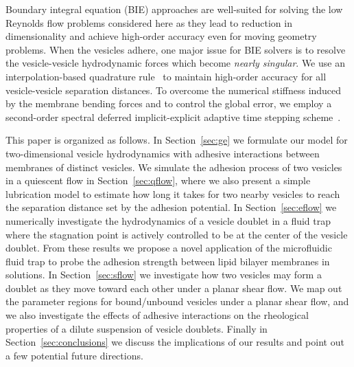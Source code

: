\documentclass[prf,superscriptaddress,showkeys]{revtex4-1}
\begin{document}
Boundary integral equation (BIE) approaches are well-suited for solving
the low Reynolds flow problems considered here as they lead to reduction
in dimensionality and achieve high-order accuracy even for moving
geometry problems. When the vesicles adhere, one major issue for BIE
solvers is to resolve the vesicle-vesicle hydrodynamic forces which
become {\em nearly singular}.  We use an interpolation-based quadrature
rule~\cite{qua-bir2014} to maintain high-order accuracy for all
vesicle-vesicle separation distances.  To overcome the numerical
stiffness induced by the membrane bending forces and to control the
global error, we employ a second-order spectral deferred
implicit-explicit adaptive time stepping
scheme~\cite{quaife2016adaptive}. 

This paper is organized as follows. In Section~\ref{sec:ge} we formulate
our model for two-dimensional vesicle hydrodynamics with adhesive
interactions between membranes of distinct vesicles.  We simulate the
adhesion process of two vesicles in a quiescent flow in
Section~\ref{sec:qflow}, where we also present a simple lubrication
model to estimate how long it takes for two nearby vesicles to reach the
separation distance set by the adhesion potential.  In
Section~\ref{sec:eflow} we numerically investigate the hydrodynamics of
a vesicle doublet in a fluid trap where the stagnation point is actively
controlled to be at the center of the vesicle doublet. From these
results we propose a novel application of the microfluidic fluid trap to
probe the adhesion strength between lipid bilayer membranes in
solutions. In Section~\ref{sec:sflow} we investigate how two vesicles
may form a doublet as they move toward each other under a planar shear
flow.  We map out the parameter regions for bound/unbound vesicles under
a planar shear flow, and we also investigate the effects of adhesive
interactions on the rheological properties of a dilute suspension of
vesicle doublets.  Finally in Section~\ref{sec:conclusions} we discuss
the implications of our results and point out a few potential future
directions.

\end{document}
